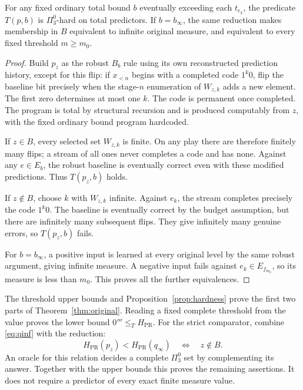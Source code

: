 \documentclass[11pt]{article}
\begin{document}
\begin{proposition}\label{prop:hardness}
For any fixed ordinary total bound $b$ eventually exceeding each
$t_{e_k}$, the predicate $T(p,b)$ is $\Pi^0_3$-hard on total
predictors. If $b=b_\infty$, the same reduction makes membership in
$B$ equivalent to infinite original measure, and equivalent to every
fixed threshold $m\ge m_0$.
\end{proposition}
\begin{proof}
Build $p_z$ as the robust $B_b$ rule using its own reconstructed
prediction history, except for this flip: if $x_{<n}$ begins with a
completed code $1^k0$, flip the baseline bit precisely when the
stage-$n$ enumeration of $W_{z,k}$ adds a new element. The first zero
determines at most one $k$. The code is permanent once completed.
The program is total by structural recursion and is produced
computably from $z$, with the fixed ordinary bound program hardcoded.

If $z\in B$, every selected set $W_{z,k}$ is finite. On any play
there are therefore finitely many flips; a stream of all ones never
completes a code and has none. Against any $e\in E_b$, the robust
baseline is eventually correct even with these modified predictions.
Thus $T(p_z,b)$ holds.

If $z\notin B$, choose $k$ with $W_{z,k}$ infinite. Against $e_k$,
the stream completes precisely the code $1^k0$. The baseline is
eventually correct by the budget assumption, but there are infinitely
many subsequent flips. They give infinitely many genuine errors,
so $T(p_z,b)$ fails.

For $b=b_\infty$, a positive input is learned at every original
level by the same robust argument, giving infinite measure. A
negative input fails against $e_k\in E_{f_{m_0}}$, so its measure is
less than $m_0$. This proves all the further equivalences.
\end{proof}

The threshold upper bounds and Proposition~\ref{prop:hardness} prove
the first two parts of Theorem~\ref{thm:original}. Reading a fixed
complete threshold from the value proves the lower bound
$0'''\le_T H_{\mathrm{PR}}$.
For the strict comparator, combine \eqref{eq:qinf} with the reduction:
\[
 H_{\mathrm{PR}}(p_z)<H_{\mathrm{PR}}(q_\infty)
 \quad\Longleftrightarrow\quad z\notin B.
\]
An oracle for this relation decides a complete $\Pi^0_3$ set by
complementing its answer. Together with the upper bounds this proves
the remaining assertions. It does not require a predictor of every
exact finite measure value.
\end{document}
